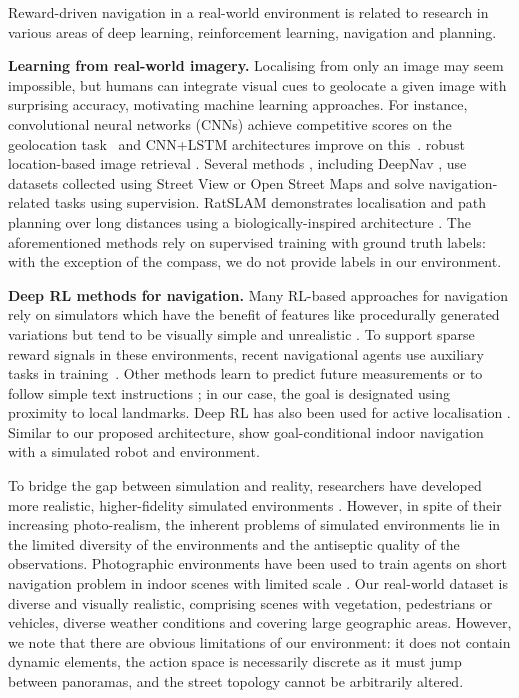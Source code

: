 Reward-driven navigation in a real-world environment is related to research in various areas of deep learning, reinforcement learning, navigation and planning.

{\bf Learning from real-world imagery.}
Localising from only an image may seem impossible, but humans can integrate visual cues to geolocate a given image with surprising  accuracy, motivating machine learning approaches. For instance, convolutional neural networks (CNNs) achieve competitive scores on the geolocation task~\cite{weyand2016planet} and CNN+LSTM architectures improve on this~\cite{donahue2015long, malinowski2017ask}.
robust location-based image retrieval \cite{arandjelovic2016netvlad}. 
Several methods \cite{berriel2018heading,khosla2014looking}, including DeepNav \cite{brahmbhatt2017deepnav}, use datasets collected using Street View or Open Street Maps and solve navigation-related tasks using supervision. RatSLAM demonstrates localisation and path planning over long distances using a biologically-inspired architecture \cite{milford2004ratslam}.
The aforementioned methods rely on supervised training with ground truth labels: with the exception of the compass, we do not provide labels in our environment. 

{\bf Deep RL methods for navigation.}
Many RL-based approaches for navigation rely on simulators which have the benefit of features like procedurally generated variations but tend to be visually simple and unrealistic \cite{beattie2016deepmind,kempka2016vizdoom,tessler_aaai17}. To support sparse reward signals in these environments, recent navigational agents use auxiliary tasks in training~\cite{mirowski2016learning,jaderberg2016reinforcement,lample_aaai17}. Other methods learn to predict future measurements or to follow simple text instructions \cite{dosovitskiy2016learning,hill2017understanding,hermann2017grounded,chaplot2017gated}; in our case, the goal is designated using proximity to local landmarks. Deep RL has also been used for active localisation \cite{chaplot2018active}. Similar to our proposed architecture, \cite{zhu_icra2017} show goal-conditional indoor navigation with a simulated robot and environment. 

To bridge the gap between simulation and reality, researchers have developed more realistic, higher-fidelity simulated environments \cite{dosovitskiy2017carla,kolve2017ai2,shah2018airsim,wu2018building}. However, in spite of their increasing photo-realism, the inherent problems of simulated environments lie in the limited diversity of the environments and the antiseptic quality of the observations. Photographic environments have been used to train agents on short navigation problem in indoor scenes with limited scale \cite{chang2017matterport3d,anderson2017vision,bruce2017one,mo2018adobeindoornav}. Our real-world dataset is diverse and visually realistic, comprising scenes with vegetation, pedestrians or vehicles, diverse weather conditions and covering large geographic areas. However, we note that there are obvious limitations of our environment: it does not contain dynamic elements, the action space is necessarily discrete as it must jump between panoramas, and the street topology cannot be arbitrarily altered.

